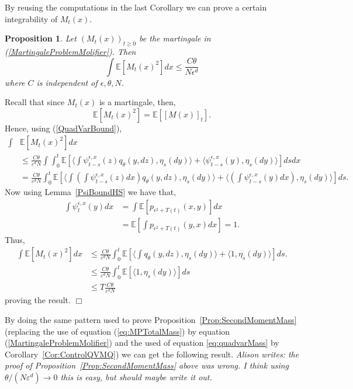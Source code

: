 \documentclass[12pt]{article}
\newenvironment {proof}{{\noindent\bf Proof }}{\hfill $\Box$ \medskip}
\newtheorem{proposition}[theorem]{Proposition}
\newcommand{\IE}{\mathbb E}
\newcommand{\comment}[1]{{\color{blue} \it #1}}
\begin{document}
By reusing the computations in the last Corollary we can prove a certain integrability of $M_t(x)$.
\begin{proposition}
Let $(M_t(x))_{t \geq 0}$ be the martingale in (\ref{MartingaleProblemMolifier}). Then
\[ \int \IE\left[ M_t(x)^2 \right] dx \leq \frac{C \theta}{ N \epsilon^{d}} \]
where $C$ is independent of $\epsilon,\theta,N$. \label{IntegrabilityOfM}
\end{proposition}
\begin{proof}
Recall that since $M_t(x)$ is a martingale, then,
\[ \IE\left[ M_t(x)^2 \right] = \IE\left[ [M(x)]_t \right].  \]
Hence, using (\ref{QuadVarBound}),
\begin{align*}
\int &\IE\left[ M_t(x)^2 \right] dx \\ & \leq \frac{C \theta}{\varepsilon^d N} \int \int_0^t \IE\left[ \langle \int \psi_{t-s}^{\epsilon,x}(z) q_\theta(y,dz), \eta_s(dy) \rangle + \langle \psi_{t-s}^{\epsilon,x}(y), \eta_s(dy)\rangle \right] ds  dx \\ &=  \frac{C \theta}{\varepsilon^d N}  \int_0^t \IE \left[  \langle \int \left( \int \psi_{t-s}^{\epsilon,x}(z) dx \right) q_\theta(y,dz), \eta_s(dy) \rangle + \langle \left( \int  \psi_{t-s}^{\epsilon,x}(y) dx \right), \eta_s(dy)\rangle \right] ds.
\end{align*}
Now using Lemma~\ref{PsiBoundHS} we have that,
\begin{align*}
\int \psi_t^{\epsilon, x}(y) dx & = \int \IE[p_{\epsilon^2+T(t)}(x,y)] dx \\ &= \IE[ \int p_{\epsilon^2+T(t)}(y,x) dx ] = 1.
\end{align*}
Thus,
\begin{align*}
\int \IE\left[ M_t(x)^2 \right] dx & \leq  \frac{C \theta}{\varepsilon^d N}  \int_0^t \IE \left[  \langle \int  q_\theta(y,dz), \eta_s(dy) \rangle + \langle 1, \eta_s(dy)\rangle \right] ds. \\ & \leq \frac{C \theta}{\varepsilon^d N} \int_0^t \IE[ \langle 1, \eta_s(dy) \rangle ] ds \\ & \leq T \frac{C \theta}{ \varepsilon^d N}
\end{align*}
proving the result.
\end{proof}

By doing the same pattern used to prove Proposition~\ref{Prop:SecondMomentMass} (replacing the use of equation (\ref{eq:MPTotalMass}) by equation (\ref{MartingaleProblemMolifier}) and the used of equation \ref{eq:quadvarMass} by Corollary~\ref{Cor:ControlQVMQ}) we can get the following result.
\comment{Alison writes: the proof of Proposition~\ref{Prop:SecondMomentMass} above was wrong.
I think using $\theta/(N \varepsilon^d) \to 0$ this is easy, but should maybe write it out.}
\end{document}
